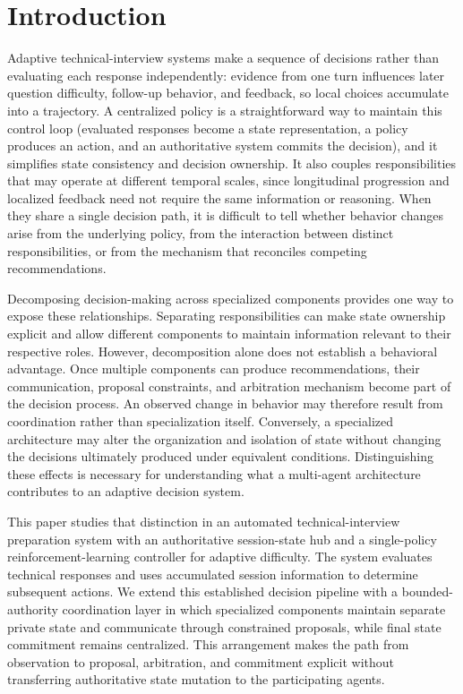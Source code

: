 \section{Introduction}\label{sec:intro}

Adaptive technical-interview systems make a sequence of decisions rather than evaluating each response independently: evidence from one turn influences later question difficulty, follow-up behavior, and feedback, so local choices accumulate into a trajectory. A centralized policy is a straightforward way to maintain this control loop (evaluated responses become a state representation, a policy produces an action, and an authoritative system commits the decision), and it simplifies state consistency and decision ownership. It also couples responsibilities that may operate at different temporal scales, since longitudinal progression and localized feedback need not require the same information or reasoning. When they share a single decision path, it is difficult to tell whether behavior changes arise from the underlying policy, from the interaction between distinct responsibilities, or from the mechanism that reconciles competing recommendations.

Decomposing decision-making across specialized components provides one way to expose these relationships. Separating responsibilities can make state ownership explicit and allow different components to maintain information relevant to their respective roles. However, decomposition alone does not establish a behavioral advantage. Once multiple components can produce recommendations, their communication, proposal constraints, and arbitration mechanism become part of the decision process. An observed change in behavior may therefore result from coordination rather than specialization itself. Conversely, a specialized architecture may alter the organization and isolation of state without changing the decisions ultimately produced under equivalent conditions. Distinguishing these effects is necessary for understanding what a multi-agent architecture contributes to an adaptive decision system.

This paper studies that distinction in an automated technical-interview preparation system with an authoritative session-state hub and a single-policy reinforcement-learning controller for adaptive difficulty. The system evaluates technical responses and uses accumulated session information to determine subsequent actions. We extend this established decision pipeline with a bounded-authority coordination layer in which specialized components maintain separate private state and communicate through constrained proposals, while final state commitment remains centralized. This arrangement makes the path from observation to proposal, arbitration, and commitment explicit without transferring authoritative state mutation to the participating agents.

